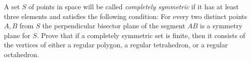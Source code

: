 A set $S$ of points in space will be called \emph{completely symmetric} if it has at least three elements and satisfies the following condition: For every two distinct points $A, B$ from $S$ the perpendicular bisector plane of the segment $AB$ is a symmetry plane for $S$. Prove that if a completely symmetric set is finite, then it consists of the vertices of either a regular polygon, a regular tetrahedron, or a regular octahedron.
